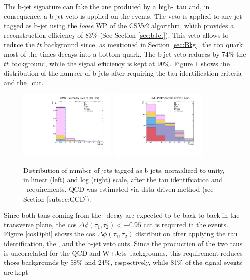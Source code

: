 \noindent The b-jet signature can fake the one produced by a high-\pt~tau and, in consequence,
a b-jet veto is applied on the events. The veto is applied to any jet
tagged as b-jet using the \textit{loose} WP of the CSVv2 algorithm, which provides 
a reconstruction efficiency of 83$\%$ (See Section \ref{sec:bJet}). This veto allows to reduce 
the $t\bar{t}$ background since, as mentioned in Section \ref{sec:Bkg}, 
the top quark most of the times decays into a bottom quark. The b-jet veto
reduces by 74$\%$ the $t\bar{t}$ background, while the signal efficiency 
is kept at 90$\%$. Figure \ref{bjet} shows the distribution of the number of b-jets 
after requiring the tau identification criteria and the \MET~cut.\\

  \begin{figure}[H]
 \begin{center}
 \captionsetup[subfloat]{farskip=0pt,captionskip=0.0cm,labelformat=empty}
 \includegraphics[clip,width=0.43\textwidth]{figuras/Chapter5/TauID_Plots/NBJets.pdf}
 \includegraphics[clip,width=0.43\textwidth]{figuras/Chapter5/TauID_Plots/NBJets_log.pdf}
 \end{center}
 \caption{Distribution of number of jets tagged as b-jets, normalized to unity, in linear (left) and log (right) scale, after 
 the tau identification and \MET~requirements. QCD was estimated  via data-driven method (see Section \ref{subsec:QCD}).}
 \label{bjet}
 \end{figure}

 \noindent Since both taus coming from the \Zprime~decay are expected to be back-to-back
 in the transverse plane, the cos $\Delta \phi (\tau_{1},\tau_{2}) < -0.95$ cut is required in 
 the events. Figure \ref{cosDphi} shows the cos $\Delta \phi (\tau_{1},\tau_{2})$ distribution after applying
 the tau identification, the \MET, and the b-jet veto cuts. Since the production of the 
 two taus is uncorrelated for the QCD and W+Jets backgrounds, this requirement
 reduces those backgrounds by 58$\%$ and 24$\%$, respectively, while 
 81$\%$ of the signal events are kept. \\
 
